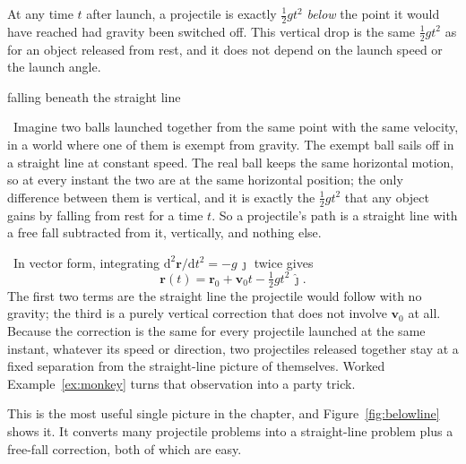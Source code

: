 \documentclass[11pt,twoside,openany]{book}
\newcommand{\dd}{\mathrm{d}}
\newcommand{\viewtag}[3]{\fcolorbox{#2}{#3}{\footnotesize\textbf{\textcolor{#2}{#1}}}}
\newcommand{\elemtag}{\viewtag{Elementary}{elemcol}{elempale}}
\newcommand{\calctag}{\viewtag{Calculus}{calccol}{calcpale}}
\newcommand{\elem}{\par\medskip\noindent\elemtag\ }
\newcommand{\calc}{\par\medskip\noindent\calctag\ }
\begin{document}
\begin{keyidea}
At any time $t$ after launch, a projectile is exactly $\tfrac12 g t^2$ \emph{below} the point it would have reached had gravity been switched off. This vertical drop is the same $\tfrac12 g t^2$ as for an object released from rest, and it does not depend on the launch speed or the launch angle.
\end{keyidea}

\begin{twoviews}{falling beneath the straight line}
\elem Imagine two balls launched together from the same point with the same velocity, in a world where one of them is exempt from gravity. The exempt ball sails off in a straight line at constant speed. The real ball keeps the same horizontal motion, so at every instant the two are at the same horizontal position; the only difference between them is vertical, and it is exactly the $\tfrac12 g t^2$ that any object gains by falling from rest for a time $t$. So a projectile's path is a straight line with a free fall subtracted from it, vertically, and nothing else.

\calc In vector form, integrating $\dd^2\mathbf{r}/\dd t^2 = -g\,\hat{\mathbf{\jmath}}$ twice gives
\[
\mathbf{r}(t) = \mathbf{r}_0 + \mathbf{v}_0 t - \tfrac12 g t^{2}\,\hat{\mathbf{\jmath}} .
\]
The first two terms are the straight line the projectile would follow with no gravity; the third is a purely vertical correction that does not involve $\mathbf{v}_0$ at all. Because the correction is the same for every projectile launched at the same instant, whatever its speed or direction, two projectiles released together stay at a fixed separation from the straight-line picture of themselves. Worked Example~\ref{ex:monkey} turns that observation into a party trick.
\end{twoviews}

This is the most useful single picture in the chapter, and Figure~\ref{fig:belowline} shows it. It converts many projectile problems into a straight-line problem plus a free-fall correction, both of which are easy.
\end{document}
